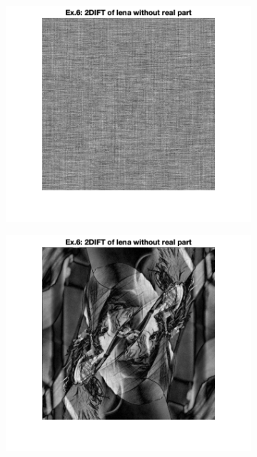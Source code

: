 \documentclass{article}
\begin{document}
\begin{enumerate}
\begin{figure}
\begin{subfigure}[c]{0.3\textwidth}
        \label{fig:fourier_real}
    \end{subfigure}
    \begin{subfigure}[c]{0.3\textwidth}
        \includegraphics[width=\textwidth]{images/leana_imag.png}
    \end{subfigure}
    \begin{subfigure}[c]{0.3\textwidth}
        \includegraphics[width=\textwidth]{images/lena_imag_mag.png}

\end{subfigure}
\end{figure}
\end{enumerate}
\end{document}
